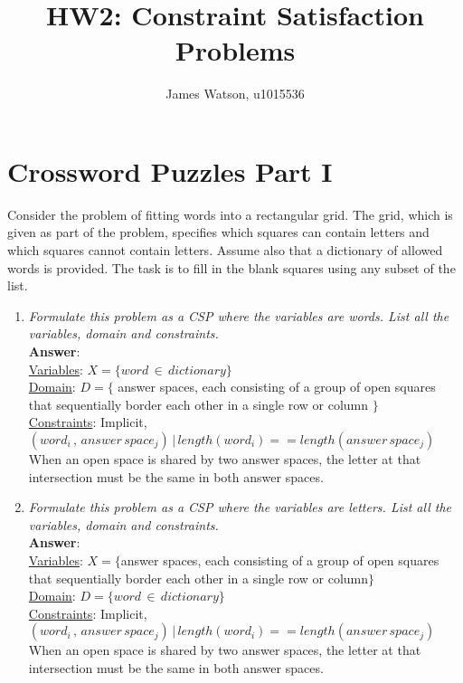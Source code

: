 \documentclass[fleqn]{hermans-hw}
\title{HW2: Constraint Satisfaction Problems}
\institute{University of Utah}
\author{James Watson, u1015536}
\begin{document}
\maketitle
\section{Crossword Puzzles Part I}

Consider the problem of fitting words into a rectangular grid. The grid, which is given as part of the problem, specifies which squares can contain letters and which squares cannot contain letters. Assume also that a dictionary of allowed words is provided. The task is to fill in the blank squares using any subset of the list.
\begin{enumerate}
\item \textit{Formulate this problem as a CSP where the variables are words. List all the variables, domain and constraints.}\\
\textbf{Answer}:\\
\underline{Variables}: $ X = \lbrace word \,\in \, dictionary \rbrace $\\
\underline{Domain}: $ D = \lbrace$ answer spaces, each consisting of a group of open squares that sequentially border each other in a single row or column  $ \rbrace $\\
\underline{Constraints}: Implicit,\\
$ (word_{i} \, , \, answer\,space_{j}) \, | \, length(word_{i}) == length(answer\,space_{j})$\\
When an open space is shared by two answer spaces, the letter at that intersection must be the same in both answer spaces.
\item \textit{Formulate this problem as a CSP where the variables are letters. List all the variables, domain and constraints.}\\
\textbf{Answer}:\\
\underline{Variables}: $ X = \lbrace$answer spaces, each consisting of a group of open squares that sequentially border each other in a single row or column$ \rbrace $\\
\underline{Domain}:  $ D = \lbrace word \,\in \, dictionary \rbrace $\\
\underline{Constraints}: Implicit,\\
$ (word_{i} \, , \, answer\,space_{j}) \, | \, length(word_{i}) == length(answer\,space_{j})$\\
When an open space is shared by two answer spaces, the letter at that intersection must be the same in both answer spaces.

\end{enumerate}
\end{document}
